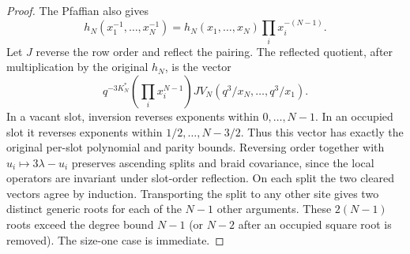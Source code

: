 \begin{proof}
The Pfaffian also gives
\begin{equation}\label{eq:02-reciprocity}
 h_N(x_1^{-1},\ldots,x_N^{-1})
 =h_N(x_1,\ldots,x_N)\prod_i x_i^{-(N-1)}.
\end{equation}
Let $J$ reverse the row order and reflect the pairing. The reflected
quotient, after multiplication by the original $h_N$, is the vector
\[
 q^{-3K_N^*}\left(\prod_i x_i^{N-1}\right)
       J V_N(q^3/x_N,\ldots,q^3/x_1).
\]
In a vacant slot, inversion reverses exponents within $0,\ldots,N-1$.
In an occupied slot it reverses exponents within
$1/2,\ldots,N-3/2$. Thus this vector has exactly the original
per-slot polynomial and parity bounds. Reversing order together with
$u_i\mapsto3\lambda-u_i$ preserves ascending splits and braid
covariance, since the local operators are invariant under slot-order
reflection. On each split the two cleared vectors agree by induction.
Transporting the split to any other site gives two distinct generic
roots for each of the $N-1$ other arguments. These $2(N-1)$ roots
exceed the degree bound $N-1$ (or $N-2$ after an occupied square root
is removed). The size-one case is immediate.
\end{proof}

